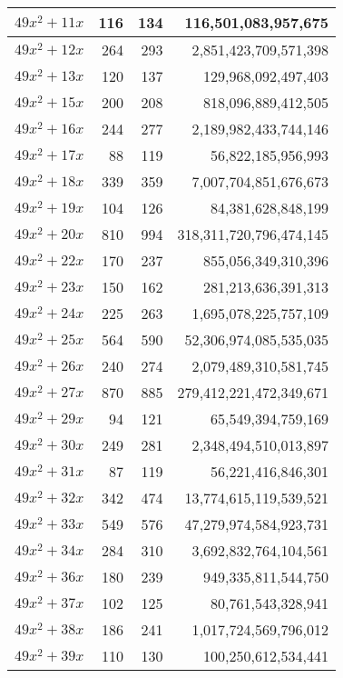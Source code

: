 \documentclass[a4paper]{amsproc}
\theoremstyle{plain}
\begin{document}
\begin{longtable}{ | l | r | r | r | }
$49x^2 + 11x$ & 116 & 134 & 116{,}501{,}083{,}957{,}675 \\ \hline
$49x^2 + 12x$ & 264 & 293 & 2{,}851{,}423{,}709{,}571{,}398 \\ \hline
$49x^2 + 13x$ & 120 & 137 & 129{,}968{,}092{,}497{,}403 \\ \hline
$49x^2 + 15x$ & 200 & 208 & 818{,}096{,}889{,}412{,}505 \\ \hline
$49x^2 + 16x$ & 244 & 277 & 2{,}189{,}982{,}433{,}744{,}146 \\ \hline
$49x^2 + 17x$ & 88 & 119 & 56{,}822{,}185{,}956{,}993 \\ \hline
$49x^2 + 18x$ & 339 & 359 & 7{,}007{,}704{,}851{,}676{,}673 \\ \hline
$49x^2 + 19x$ & 104 & 126 & 84{,}381{,}628{,}848{,}199 \\ \hline
$49x^2 + 20x$ & 810 & 994 & 318{,}311{,}720{,}796{,}474{,}145 \\ \hline
$49x^2 + 22x$ & 170 & 237 & 855{,}056{,}349{,}310{,}396 \\ \hline
$49x^2 + 23x$ & 150 & 162 & 281{,}213{,}636{,}391{,}313 \\ \hline
$49x^2 + 24x$ & 225 & 263 & 1{,}695{,}078{,}225{,}757{,}109 \\ \hline
$49x^2 + 25x$ & 564 & 590 & 52{,}306{,}974{,}085{,}535{,}035 \\ \hline
$49x^2 + 26x$ & 240 & 274 & 2{,}079{,}489{,}310{,}581{,}745 \\ \hline
$49x^2 + 27x$ & 870 & 885 & 279{,}412{,}221{,}472{,}349{,}671 \\ \hline
$49x^2 + 29x$ & 94 & 121 & 65{,}549{,}394{,}759{,}169 \\ \hline
$49x^2 + 30x$ & 249 & 281 & 2{,}348{,}494{,}510{,}013{,}897 \\ \hline
$49x^2 + 31x$ & 87 & 119 & 56{,}221{,}416{,}846{,}301 \\ \hline
$49x^2 + 32x$ & 342 & 474 & 13{,}774{,}615{,}119{,}539{,}521 \\ \hline
$49x^2 + 33x$ & 549 & 576 & 47{,}279{,}974{,}584{,}923{,}731 \\ \hline
$49x^2 + 34x$ & 284 & 310 & 3{,}692{,}832{,}764{,}104{,}561 \\ \hline
$49x^2 + 36x$ & 180 & 239 & 949{,}335{,}811{,}544{,}750 \\ \hline
$49x^2 + 37x$ & 102 & 125 & 80{,}761{,}543{,}328{,}941 \\ \hline
$49x^2 + 38x$ & 186 & 241 & 1{,}017{,}724{,}569{,}796{,}012 \\ \hline
$49x^2 + 39x$ & 110 & 130 & 100{,}250{,}612{,}534{,}441 \\ \hline

\end{longtable}
\end{document}
